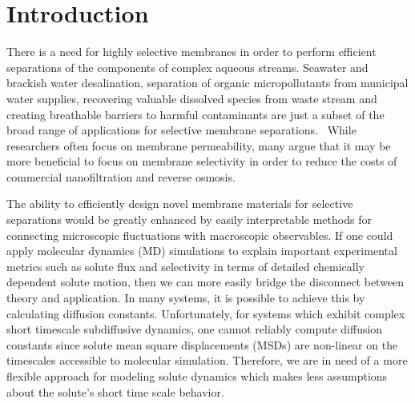 \documentclass[journal=jpcbfk,manuscript=article]{achemso}
\begin{document}
  \section{Introduction}
  
  There is a need for highly selective membranes in order to perform efficient 
  separations of the components of complex aqueous streams. Seawater and
  brackish water desalination, separation of organic micropollutants from 
  municipal water supplies, recovering valuable dissolved species from 
  waste stream and creating breathable barriers to harmful contaminants are just a
  subset of the broad range of applications for selective membrane separations.~\cite{fritzmann_state---art_2007,fonseca_couto_critical_2018,dischinger_evaluation_2019,ramaseshan_functionalized_2006}
  While researchers often focus on membrane permeability, many argue that
  it may be more beneficial to focus on membrane selectivity in order to 
  reduce the costs of commercial nanofiltration and reverse osmosis.~\cite{werber_materials_2016}
  
  The ability to efficiently design novel membrane materials for selective separations
  would be greatly enhanced by easily interpretable methods for connecting microscopic
  fluctuations with macroscopic observables. If one could apply molecular dynamics 
  (MD) simulations to explain important experimental metrics such as solute flux and 
  selectivity in terms of detailed chemically dependent solute motion, then we can more
  easily bridge the disconnect between theory and application. In many systems, it is 
  possible to achieve this by calculating diffusion constants. 
  Unfortunately, for 
  systems which exhibit complex short timescale subdiffusive dynamics, one cannot 
  reliably compute diffusion constants since solute mean square 
  displacements (MSDs) are non-linear on the timescales accessible to molecular simulation.
  Therefore, we are in need of a more flexible approach for modeling solute dynamics
  which makes less assumptions about the solute's short time scale behavior.
  
\end{document}

